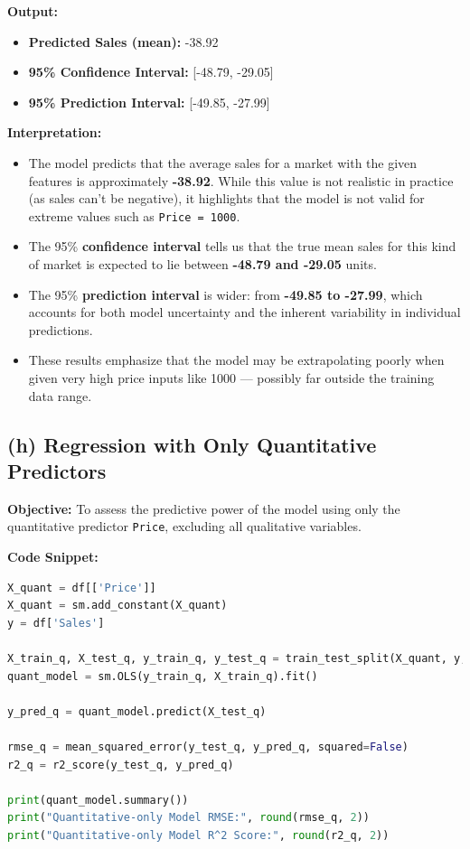 \documentclass[12pt]{article}
\begin{document}
\vspace{1em}
\noindent\textbf{Output:}
\begin{itemize}
    \item \textbf{Predicted Sales (mean):} -38.92
    \item \textbf{95\% Confidence Interval:} [-48.79, -29.05]
    \item \textbf{95\% Prediction Interval:} [-49.85, -27.99]
\end{itemize}

\vspace{0.5em}
\textbf{Interpretation:}
\begin{itemize}
    \item The model predicts that the average sales for a market with the given features is approximately \textbf{-38.92}. While this value is not realistic in practice (as sales can't be negative), it highlights that the model is not valid for extreme values such as \texttt{Price = 1000}.
    \item The 95\% \textbf{confidence interval} tells us that the true mean sales for this kind of market is expected to lie between \textbf{-48.79 and -29.05} units.
    \item The 95\% \textbf{prediction interval} is wider: from \textbf{-49.85 to -27.99}, which accounts for both model uncertainty and the inherent variability in individual predictions.
    \item These results emphasize that the model may be extrapolating poorly when given very high price inputs like 1000 — possibly far outside the training data range.
\end{itemize}

\subsection*{(h) Regression with Only Quantitative Predictors}

\textbf{Objective:} To assess the predictive power of the model using only the quantitative predictor \texttt{Price}, excluding all qualitative variables.

\noindent\textbf{Code Snippet:}
\begin{lstlisting}[language=Python]
X_quant = df[['Price']]
X_quant = sm.add_constant(X_quant)
y = df['Sales']

X_train_q, X_test_q, y_train_q, y_test_q = train_test_split(X_quant, y, test_size=0.2, random_state=42)
quant_model = sm.OLS(y_train_q, X_train_q).fit()

y_pred_q = quant_model.predict(X_test_q)

rmse_q = mean_squared_error(y_test_q, y_pred_q, squared=False)
r2_q = r2_score(y_test_q, y_pred_q)

print(quant_model.summary())
print("Quantitative-only Model RMSE:", round(rmse_q, 2))
print("Quantitative-only Model R^2 Score:", round(r2_q, 2))
\end{lstlisting}
\end{document}

